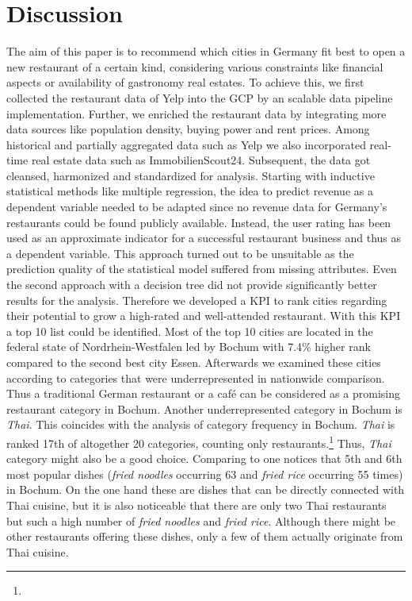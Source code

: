 \section{Discussion}
\label{sec:discussion}
The aim of this paper is to recommend which cities in Germany fit best to open a new restaurant of a certain kind, considering various constraints like financial aspects or availability of gastronomy real estates. To achieve this, we first collected the restaurant data of Yelp into the \ac{GCP} by an scalable data pipeline implementation. Further, we enriched the restaurant data by integrating more data sources like population density, buying power and rent prices. 
Among historical and partially aggregated data such as Yelp we also incorporated real-time real estate data such as ImmobilienScout24. Subsequent, the data got cleansed, harmonized and standardized for analysis. Starting with inductive statistical methods like multiple regression, the idea to predict revenue as a dependent variable needed to be adapted since no revenue data for Germany's restaurants could be found publicly available. Instead, the user rating has been used as an approximate indicator for a successful restaurant business and thus as a dependent variable. This approach turned out to be unsuitable as the prediction quality of the statistical model suffered from missing attributes. Even the second approach with a decision tree did not provide significantly better results for the analysis. Therefore we developed a \ac{KPI} to rank cities regarding their potential to grow a high-rated and well-attended restaurant. With this \ac{KPI} a top 10 list could be identified. Most of the top 10 cities are located in the federal state of Nordrhein-Westfalen led by Bochum with 7.4\% higher rank compared to the second best city Essen. Afterwards we examined these cities according to categories that were underrepresented in nationwide comparison.
Thus a traditional German restaurant or a café can be considered as a promising restaurant category in Bochum. Another underrepresented category in Bochum is \textit{Thai}. 
This coincides with the analysis of category frequency in Bochum. \textit{Thai} is ranked 17th of altogether 20 categories, counting only restaurants.\footnote{} Thus, \textit{Thai}  category might also be a good choice. Comparing to  one notices that 5th and 6th most popular dishes (\textit{fried noodles} occurring 63 and \textit{fried rice} occurring 55 times) in Bochum. On the one hand these are dishes that can be directly connected with Thai cuisine, but it is also noticeable that there are only two Thai restaurants but such a high number of \textit{fried noodles} and \textit{fried rice}. Although there might be other restaurants offering these dishes, only a few of them actually originate from Thai cuisine.%
